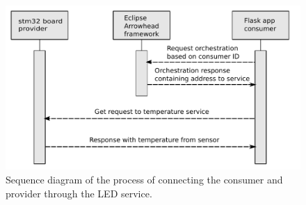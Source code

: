\begin{figure}[H]
    \centering
    \includegraphics[width=\textwidth]{Pictures/sequence_diagram_consumer.pdf} 
    \caption{Sequence diagram of the process of connecting the consumer and provider through the LED service.}
    \label{sequence diagram consumer}
\end{figure}

